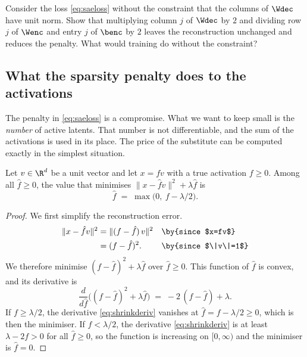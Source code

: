 \begin{exercise}\label{ex:normconstraint}
Consider the loss \eqref{eq:saeloss} without the constraint that the columns of $\Wdec$ have unit norm. Show
that multiplying column $j$ of $\Wdec$ by $2$ and dividing row $j$ of $\Wenc$ and entry $j$ of $\benc$ by $2$
leaves the reconstruction unchanged and reduces the penalty. What would training do without the constraint?
\end{exercise}

\subsection{What the sparsity penalty does to the activations}
\label{sec:shrinkage}

The penalty in \eqref{eq:saeloss} is a compromise. What we want to keep small is the \emph{number} of active
latents. That number is not differentiable, and the sum of the activations is used in its place. The price of
the substitute can be computed exactly in the simplest situation.

\begin{proposition}[Shrinkage]\label{prop:shrink}
Let $v\in\R^d$ be a unit vector and let $x=fv$ with a true activation $f\ge0$. Among all $\hat f\ge0$, the value
that minimises $\|x-\hat fv\|^2+\lambda\hat f$ is
\[
\hat f \;=\; \max\big(0,\ f-\lambda/2\big).
\]
\end{proposition}
\begin{proof}
We first simplify the reconstruction error.
\begin{align*}
\|x-\hat fv\|^2 &= \|(f-\hat f)\,v\|^2 && \by{since $x=fv$}\\
&= (f-\hat f)^2. && \by{since $\|v\|=1$}
\end{align*}
We therefore minimise $(f-\hat f)^2+\lambda\hat f$ over $\hat f\ge0$. This function of $\hat f$ is convex, and its
derivative is
\begin{equation}\label{eq:shrinkderiv}
\frac{d}{d\hat f}\Big((f-\hat f)^2+\lambda\hat f\Big) \;=\; -2\,(f-\hat f)+\lambda .
\end{equation}
If $f\ge\lambda/2$, the derivative \eqref{eq:shrinkderiv} vanishes at $\hat f=f-\lambda/2\ge0$, which is then the
minimiser. If $f<\lambda/2$, the derivative \eqref{eq:shrinkderiv} is at least $\lambda-2f>0$ for all
$\hat f\ge0$, so the function is increasing on $[0,\infty)$ and the minimiser is $\hat f=0$.
\end{proof}

